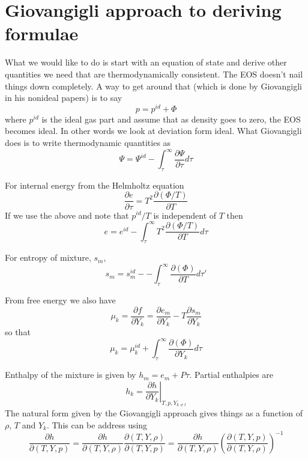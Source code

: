 \documentclass[11pt]{article}
\begin{document}
\section{Giovangigli approach to deriving formulae}

What we would like to do is start with an equation of state and derive other quantities we need that
are thermodynamically consistent.  The EOS doesn't nail things down completely.  A way to get around that
(which is done by Giovangigli in his nonideal papers) is to
say
\[
p = p^{id} + \Phi
\]
where $p^{id}$ is the ideal gas part and assume that as density goes to zero, the EOS becomes
ideal.  In other words we look at deviation form ideal.
What Giovangigli does is to write thermodynamic quantities as
\[
\Psi = \Psi^{id} - \int_\tau^\infty \frac{\partial \Psi}{\partial \tau} d \tau
\]

For internal energy from the Helmholtz equation
\begin{equation}
\frac{\partial e}{\partial \tau} = T^2 \frac{\partial (\Phi/T)} {\partial T}
\end{equation}
If we use the above and note that $p^{id}/T$ is independent of $T$ then
\begin{equation}
e = e^{id}- \int_\tau^\infty  T^2 \frac{\partial (\Phi/T)} {\partial T} d\tau
\label{eq:energy_gen}
\end{equation}

For entropy of mixture, $s_m$,
\begin{equation}
s_m = s_m^{id} -
-\int_\tau^{\infty} \frac{\partial (\Phi)} {\partial T} d\tau ' 
\end{equation}


From free energy we also have
\[
\mu_k = \frac{\partial f}{\partial Y_k} = 
 \frac{\partial e_m}{\partial Y_k} - 
 T\frac{\partial s_m}{\partial Y_k} 
\]
so that
\begin{equation}
\mu_k =
 \mu_k^{id} + \int_\tau^\infty \frac{\partial (\Phi)} {\partial Y_k} d\tau
\end{equation}

Enthalpy of the mixture is given by $h_m = e_m + P \tau$.  Partial enthalpies are
\[
h_k = \left. \frac{\partial h}{\partial Y_k} \right|_{T,p,Y_{k\ne l}}
\]
The natural form given by the Giovangigli approach gives things as a function of $\rho$, $T$ and $Y_k$.
This can be address using
\begin{equation}
\frac{\partial h}{\partial (T,Y,p)}
= \frac{\partial h}{\partial (T,Y,\rho)}
\frac{\partial (T,Y,\rho)}{\partial (T,Y,p)}
= \frac{\partial h}{\partial (T,Y,\rho)}
\left (\frac{\partial (T,Y,p)}{\partial (T,Y,\rho)} \right)^{-1}
\label{eq:calc_cov}
\end{equation}
\end{document}
